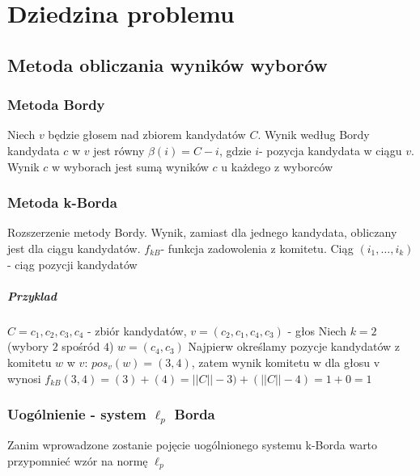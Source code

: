 \documentclass[pdflatex,11pt]{../aghdoc_version2}
\author{Tomasz Kasprzyk, Daniel Ogiela, Jakub Stępak}
\date{2016}
\begin{document}
\titlepages

\tableofcontents


\chapter{Dziedzina problemu}
\label{cha:dziedzina_problemu}

\section{Metoda obliczania wyników wyborów}
\label{sec:metoda_obliczania_wynikow_wyborow}

\subsection{Metoda Bordy}
\label{subsec:metoda_bordy}

Niech $v$ będzie głosem nad zbiorem kandydatów $C$. Wynik według Bordy kandydata $c$ w $v$ jest równy $\beta(i)=C-i$, gdzie $i$- pozycja kandydata w ciągu $v$.
Wynik $c$ w wyborach jest sumą wyników $c$ u każdego z wyborców


\subsection{Metoda k-Borda}
\label{subsec:metoda_k_borda}

Rozszerzenie metody Bordy. Wynik, zamiast dla jednego kandydata, obliczany jest dla ciągu kandydatów. $f_{kB}$- funkcja zadowolenia z komitetu. Ciąg $(i_1,\dots, i_k)$- ciąg pozycji kandydatów

\paragraph{Przyklad}
$C={c_1,c_2,c_3,c_4}$ - zbiór kandydatów, 
$v=(c_2,c_1,c_4,c_3)$ - głos
Niech $k = 2$ (wybory $2$ spośród $4$)
$w=(c_4,c_3)$
Najpierw określamy pozycje kandydatów z komitetu $w$ w $v$:
$pos_v(w)=(3,4)$, zatem wynik komitetu w dla głosu v wynosi
$f_{kB}(3,4) = (3) + (4) = ||C|| - 3 ) + ( ||C|| - 4 ) = 1 + 0 = 1$


\subsection{Uogólnienie - system $\ell_p$ Borda}
\label{subsec:system_ell_p_borda}

Zanim wprowadzone zostanie pojęcie uogólnionego systemu k-Borda warto przypomnieć wzór na normę $\ell_p$
\end{document}
